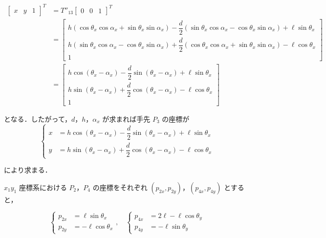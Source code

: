 \[
\begin{aligned}
\begin{bmatrix}
x & y & 1
\end{bmatrix}^T
&=
T''_{13}
\begin{bmatrix}
0 & 0 & 1
\end{bmatrix}^T \\[2ex]
&=
\left[
\begin{array}{c}
h(\cos\theta_x\cos\alpha_x + \sin\theta_x\sin\alpha_x) - \dfrac{d}{2}(\sin\theta_x\cos\alpha_x - \cos\theta_x\sin\alpha_x) + \ell\sin\theta_x \\
h(\sin\theta_x\cos\alpha_x - \cos\theta_x\sin\alpha_x) + \dfrac{d}{2}(\cos\theta_x\cos\alpha_x + \sin\theta_x\sin\alpha_x) - \ell\cos\theta_x \\
1
\end{array}
\right] \\[2ex]
&=
\left[
\begin{array}{c}
h\cos(\theta_x-\alpha_x) - \dfrac{d}{2}\sin(\theta_x-\alpha_x) + \ell\sin\theta_x \\
h\sin(\theta_x-\alpha_x) + \dfrac{d}{2}\cos(\theta_x-\alpha_x) - \ell\cos\theta_x \\
1
\end{array}
\right]
\end{aligned}
\tag{2.32}
\]

となる．したがって，$d$，$h$，$\alpha_x$ が求まれば手先 $P_3$ の座標が
\[
\left\{
\begin{aligned}
x &= h \cos(\theta_x - \alpha_x) - \dfrac{d}{2} \sin(\theta_x - \alpha_x) + \ell \sin\theta_x \\
y &= h \sin(\theta_x - \alpha_x) + \dfrac{d}{2} \cos(\theta_x - \alpha_x) - \ell \cos\theta_x
\end{aligned}
\right.
\tag{2.33}
\]

により求まる．

$x_1 y_1$ 座標系における $P_2$，$P_4$ の座標をそれぞれ $(p_{2x}, p_{2y})$，$(p_{4x}, p_{4y})$ とすると，

\[
\left\{
\begin{aligned}
p_{2x} &= \ell \sin\theta_x \\
p_{2y} &= -\ell \cos\theta_x
\end{aligned}
\right.
,\quad
\left\{
\begin{aligned}
p_{4x} &= 2\ell - \ell \cos\theta_y \\
p_{4y} &= -\ell \sin\theta_y
\end{aligned}
\right.
\tag{2.34}
\]

